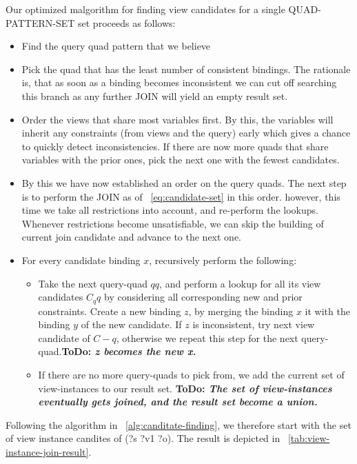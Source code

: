 \documentclass[a4paper,twoside,bibtotoc,abstracton,12pt,BCOR=15mm]{scrreprt}
\newcommand{\todo}[1]{\textbf{ToDo: \textit{#1}}}
\begin{document}
Our optimized malgorithm for finding view candidates for a single QUAD-PATTERN-SET set proceeds as follows:

\begin{itemize}
  \item  Find the query quad pattern that we believe 
  \item Pick the quad that has the least number of consistent bindings.
  The rationale is, that as soon as a binding becomes inconsistent we can cut off searching this branch as any further JOIN will yield an empty result set. 
  \item Order the views that share most variables first. By this, the variables will inherit any constraints (from views and the query) early which gives a chance to quickly detect inconsistencies.
  If there are now more quads that share variables with the prior ones, pick the next one with the fewest candidates.
  \item By this we have now established an order on the query quads. The next step is to perform the JOIN as of ~\autoref{eq:candidate-set} in this order. 
  however, this time we take all restrictions into account, and re-perform the lookups.
  Whenever restrictions become unsatisfiable, we can skip the building of current join candidate and advance to the next one.
  \item For every candidate binding $x$, recursively perform the following:
  \begin{itemize}
    \item Take the next query-quad $qq$, and perform a lookup for all its view candidates $C_qq$ by considering all corresponding new and prior constraints.
    Create a new binding $z$, by merging the binding $x$ it with the binding $y$ of the new candidate. If $z$ is inconsistent, try next view candidate
    of $C-q$, otherwise we repeat this step for the next query-quad.\todo{z becomes the new x.}
  \item If there are no more query-quads to pick from, we add the current set of view-instances to our result set.
  \todo{The set of view-instances eventually gets joined, and the result set become a union.}
  \end{itemize}
\end{itemize}

Following the algorithm in ~\autoref{alg:canditate-finding}, we therefore start with the set of view instance candites of (?s ?v1 ?o).
The result is depicted in ~\autoref{tab:view-instance-join-result}. 
\end{document}
